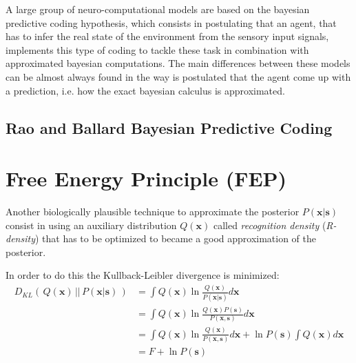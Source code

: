 \documentclass[a4paper, 10pt]{article}
\begin{document}
A large group of neuro-computational models are based on the bayesian predictive coding hypothesis, which consists in postulating that an agent, that has to infer the real state of the environment from the sensory input signals, implements this type of coding to tackle these task in combination with approximated bayesian computations. The main differences between these models can be almost always found in the way is postulated that the agent come up with a prediction, i.e. how the exact bayesian calculus is approximated.

\subsection{Rao and Ballard Bayesian Predictive Coding}

\newpage
\section{Free Energy Principle (FEP)}


Another biologically plausible technique to approximate the posterior $P(\mathbf x | \mathbf s)$ consist in using an auxiliary distribution $Q(\mathbf x)$ called \emph{recognition density} (\emph{R-density}) that has to be optimized to became a good approximation of the posterior.  

In order to do this the Kullback-Leibler  divergence is minimized:
\begin{equation}
\begin{split}
D_{KL} (\, Q(\mathbf x)\, ||\, P(\mathbf x|\mathbf s)\, ) & = \int Q(\mathbf x) \ln \frac{Q(\mathbf x)}{P(\mathbf x|\mathbf s)} d\mathbf x \\
                                  & = \int Q(\mathbf x) \ln \frac{Q(\mathbf x)P(\mathbf s)}{P(\mathbf x,\mathbf s)} d\mathbf x \\
                                  & = \int Q(\mathbf x) \ln \frac{Q(\mathbf x)}{P(\mathbf x,\mathbf s)} d\mathbf x + \ln P(\mathbf s) \int Q(\mathbf x) d\mathbf x \\
                                  & = F + \ln P(\mathbf s)
\end{split}
\end{equation}
\end{document}

